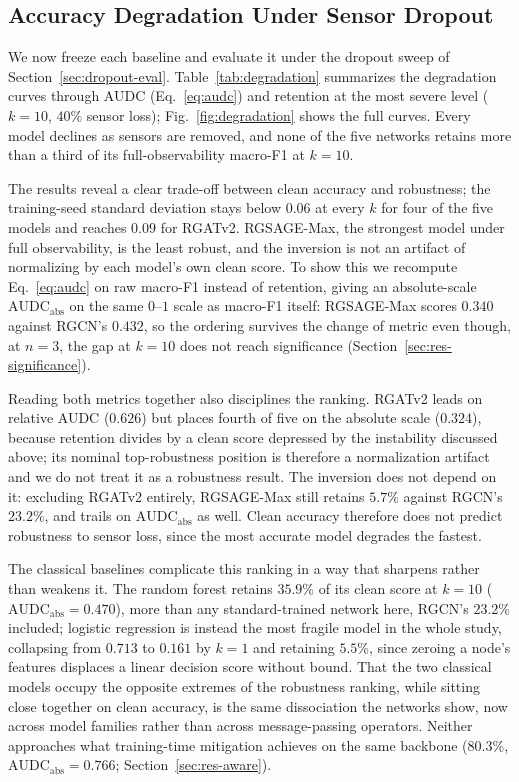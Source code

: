 \documentclass[3p,times,procedia]{elsarticle}
\begin{document}
\subsection{Accuracy Degradation Under Sensor Dropout}
\label{sec:res-degrade}

We now freeze each baseline and evaluate it under the dropout sweep of Section~\ref{sec:dropout-eval}. Table~\ref{tab:degradation} summarizes the degradation curves through AUDC (Eq.~\eqref{eq:audc}) and retention at the most severe level ($k=10$, $40\%$ sensor loss); Fig.~\ref{fig:degradation} shows the full curves. Every model declines as sensors are removed, and none of the five networks retains more than a third of its full-observability macro-F1 at $k=10$.

The results reveal a clear trade-off between clean accuracy and robustness; the training-seed standard deviation stays below $0.06$ at every $k$ for four of the five models and reaches $0.09$ for RGATv2. RGSAGE-Max, the strongest model under full observability, is the least robust, and the inversion is not an artifact of normalizing by each model's own clean score. To show this we recompute Eq.~\eqref{eq:audc} on raw macro-F1 instead of retention, giving an absolute-scale $\mathrm{AUDC_{abs}}$ on the same $0$--$1$ scale as macro-F1 itself: RGSAGE-Max scores $0.340$ against RGCN's $0.432$, so the ordering survives the change of metric even though, at $n=3$, the gap at $k=10$ does not reach significance (Section~\ref{sec:res-significance}).

Reading both metrics together also disciplines the ranking. RGATv2 leads on relative AUDC ($0.626$) but places fourth of five on the absolute scale ($0.324$), because retention divides by a clean score depressed by the instability discussed above; its nominal top-robustness position is therefore a normalization artifact and we do not treat it as a robustness result. The inversion does not depend on it: excluding RGATv2 entirely, RGSAGE-Max still retains $5.7\%$ against RGCN's $23.2\%$, and trails on $\mathrm{AUDC_{abs}}$ as well. Clean accuracy therefore does not predict robustness to sensor loss, since the most accurate model degrades the fastest.

The classical baselines complicate this ranking in a way that sharpens rather than weakens it. The random forest retains $35.9\%$ of its clean score at $k=10$ ($\mathrm{AUDC_{abs}}=0.470$), more than any standard-trained network here, RGCN's $23.2\%$ included; logistic regression is instead the most fragile model in the whole study, collapsing from $0.713$ to $0.161$ by $k=1$ and retaining $5.5\%$, since zeroing a node's features displaces a linear decision score without bound. That the two classical models occupy the opposite extremes of the robustness ranking, while sitting close together on clean accuracy, is the same dissociation the networks show, now across model families rather than across message-passing operators. Neither approaches what training-time mitigation achieves on the same backbone ($80.3\%$, $\mathrm{AUDC_{abs}}=0.766$; Section~\ref{sec:res-aware}).
\end{document}
